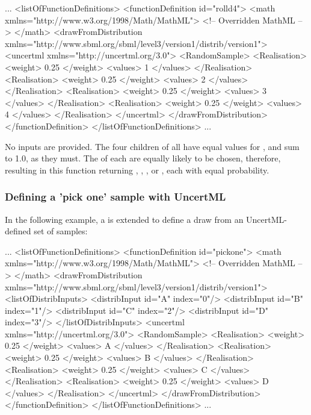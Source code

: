 \documentclass[draftspec]{sbmlpkgspec}
\begin{document}
\begin{example}
...
  <listOfFunctionDefinitions>
    <functionDefinition id="rolld4">
      <math xmlns="http://www.w3.org/1998/Math/MathML">
        <!-- Overridden MathML -->
      </math>
      <drawFromDistribution xmlns="http://www.sbml.org/sbml/level3/version1/distrib/version1">
         <uncertml xmlns="http://uncertml.org/3.0">
           <RandomSample>
             <Realisation>
               <weight> 0.25 </weight>
               <values> 1 </values>
             </Realisation>
             <Realisation>
               <weight> 0.25 </weight>
               <values> 2 </values>
             </Realisation>
             <Realisation>
               <weight> 0.25 </weight>
               <values> 3 </values>
             </Realisation>
             <Realisation>
               <weight> 0.25 </weight>
               <values> 4 </values>
             </Realisation>
         </uncertml>
      </drawFromDistribution>
    </functionDefinition>
  </listOfFunctionDefinitions>
...
\end{example}

No inputs are provided.  The four  children of  all have equal values for , and sum to 1.0, as they must.  The  of each are equally likely to be chosen, therefore, resulting in this function returning , , , or , each with equal probability.



\subsubsection{Defining a 'pick one' sample with UncertML}
In the following example, a \FunctionDefinition is extended to define a draw from an UncertML-defined set of samples:

\begin{example}
...
  <listOfFunctionDefinitions>
    <functionDefinition id="pickone">
      <math xmlns="http://www.w3.org/1998/Math/MathML">
        <!-- Overridden MathML -->
      </math>
      <drawFromDistribution xmlns="http://www.sbml.org/sbml/level3/version1/distrib/version1">
        <listOfDistribInputs>
          <distribInput id="A" index="0"/>
          <distribInput id="B" index="1"/>
          <distribInput id="C" index="2"/>
          <distribInput id="D" index="3"/>
        </listOfDistribInputs>
         <uncertml xmlns="http://uncertml.org/3.0">
           <RandomSample>
             <Realisation>
               <weight> 0.25 </weight>
               <values> A </values>
             </Realisation>
             <Realisation>
               <weight> 0.25 </weight>
               <values> B </values>
             </Realisation>
             <Realisation>
               <weight> 0.25 </weight>
               <values> C </values>
             </Realisation>
             <Realisation>
               <weight> 0.25 </weight>
               <values> D </values>
             </Realisation>
         </uncertml>
      </drawFromDistribution>
    </functionDefinition>
  </listOfFunctionDefinitions>
...
\end{example}
\end{document}
